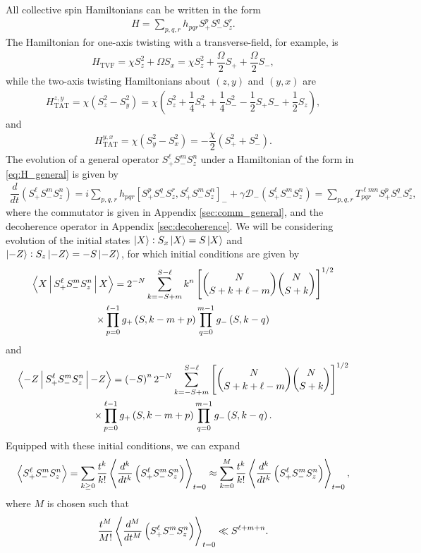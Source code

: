 \documentclass[aps,notitlepage,nofootinbib,11pt]{revtex4-1}
\renewcommand{\t}{\text} %
\newcommand{\f}[2]{\dfrac{#1}{#2}} %
\newcommand{\p}[1]{\left(#1\right)} %
\renewcommand{\sp}[1]{\left[#1\right]} %
\newcommand{\bk}{\Braket} %
\newcommand{\D}{\mathcal{D}}
\newcommand{\1}{\mathds{1}}
\begin{document}
All collective spin Hamiltonians can be written in the form
\begin{align}
  H = \sum_{p,q,r} h_{pqr} S_+^p S_-^q S_z^r.
  \label{eq:H_general}
\end{align}
The Hamiltonian for one-axis twisting with a transverse-field, for
example, is
\begin{align}
  H_{\t{TVF}}
  = \chi S_z^2 + \Omega S_x
  = \chi S_z^2 + \f{\Omega}{2} S_+ + \f{\Omega}{2} S_-,
\end{align}
while the two-axis twisting Hamiltonians about $\p{z,y}$ and $\p{y,x}$
are
\begin{align}
  H_{\t{TAT}}^{z,y}
  = \chi \p{S_z^2 - S_y^2}
  = \chi \p{S_z^2 + \f14 S_+^2 + \f14 S_-^2 - \f12 S_+ S_- + \f12 S_z},
\end{align}
and
\begin{align}
  H_{\t{TAT}}^{y,x}
  = \chi\p{S_y^2 - S_x^2}
  = -\f{\chi}{2} \p{S_+^2 + S_-^2}.
\end{align}
The evolution of a general operator $S_+^\ell S_-^m S_z^n$ under a
Hamiltonian of the form in \eqref{eq:H_general} is given by
\begin{align}
  \f{d}{dt} \p{S_+^\ell S_-^m S_z^n}
  = i\sum_{p,q,r} h_{pqr} \sp{S_+^p S_-^q S_z^r, S_+^\ell S_-^m S_z^n}_-
  + \gamma \D_-\p{S_+^\ell S_-^m S_z^n}
  = \sum_{p,q,r} T^{\ell m n}_{pqr} S_+^p S_-^q S_z^r,
\end{align}
where the commutator is given in Appendix \ref{sec:comm_general}, and
the decoherence operator in Appendix \ref{sec:decoherence}.  We will
be considering evolution of the initial states
$\ket{X}:S_x\ket{X}=S\ket{X}$ and $\ket{-Z}:S_z\ket{-Z}=-S\ket{-Z}$,
for which initial conditions are given by
\begin{multline}
  \bk{X|S_+^\ell S_-^m S_z^n|X}
  =  2^{-N} \sum_{k=-S+m}^{S-\ell} k^n
  \sp{{ N \choose S+k+\ell-m } { N \choose S+k }}^{1/2} \\
  \times \prod_{p=0}^{\ell-1} g_+\p{S,k-m+p}
  \prod_{q=0}^{m-1} g_-\p{S,k-q}
\end{multline}
and
\begin{multline}
  \bk{-Z|S_+^\ell S_-^m S_z^n|-Z}
  = \p{-S}^n 2^{-N} \sum_{k=-S+m}^{S-\ell}
  \sp{{ N \choose S+k+\ell-m } { N \choose S+k }}^{1/2} \\
  \times \prod_{p=0}^{\ell-1} g_+\p{S,k-m+p}
  \prod_{q=0}^{m-1} g_-\p{S,k-q}.
\end{multline}
Equipped with these initial conditions, we can expand
\begin{align}
  \bk{S_+^\ell S_-^m S_z^n}
  = \sum_{k\ge0} \f{t^k}{k!}
  \bk{\f{d^k}{dt^k}\p{S_+^\ell S_-^m S_z^n}}_{t=0}
  \approx \sum_{k=0}^M \f{t^k}{k!}
  \bk{\f{d^k}{dt^k}\p{S_+^\ell S_-^m S_z^n}}_{t=0},
\end{align}
where $M$ is chosen such that
\begin{align}
  \f{t^M}{M!} \bk{\f{d^M}{dt^M}\p{S_+^\ell S_-^m S_z^n}}_{t=0}
  \ll S^{\ell+m+n}.
\end{align}
\end{document}
